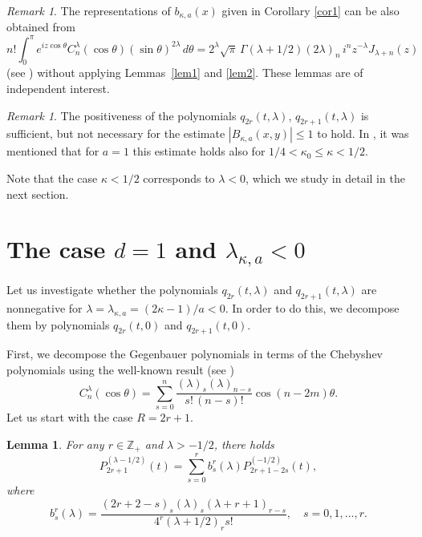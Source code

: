 \documentclass[12pt,twoside,reqno]{amsart}\usepackage[cp1251]{inputenc}
\theoremstyle{plain}
\newtheorem{lemma}[theorem]{Lemma}
\theoremstyle{remark}
\newtheorem{remark}[theorem]{Remark}
\begin{document}
\begin{remark}%
The  representations of $b_{\kappa,a}(x)$ given in Corollary \ref{cor1} can be also obtained from %
\[
n!\int_{0}^{\pi}e^{iz\cos\theta}C_{n}^{\lambda}(\cos\theta)(\sin\theta)^{2\lambda}\,d\theta=
2^{\lambda}\sqrt{\pi}\,\Gamma(\lambda+1/2)(2\lambda)_n\,i^nz^{-\lambda}J_{\lambda+n}(z)
\]
(see \cite[Chapt. X, 10.9(38)]{BE53a}) without applying Lemmas~\ref{lem1} and \ref{lem2}. These lemmas are of independent interest.
\end{remark}

\begin{remark}%
The positiveness of the polynomials $q_{2r}(t,\lambda)$, $q_{2r+1}(t,\lambda)$ is sufficient, but not necessary
for the estimate $|B_{\kappa,a}(x,y)|\le 1$ to hold.
In \cite{GIT16}, it was mentioned that for
$a=1$ this estimate holds also for  $1/4<\kappa_0\le \kappa<1/2$.
\end{remark}

Note that the case $\kappa<1/2$ corresponds to $\lambda<0$, which we study in detail in the next section.


\vspace{0.6mm}

\section{The case $d=1$ and $\lambda_{\kappa,a}<0$}\label{sec3}

Let us investigate whether  the polynomials  $q_{2r}(t,\lambda)$ and
$q_{2r+1}(t,\lambda)$ are nonnegative for  $\lambda=\lambda_{\kappa,a}=(2\kappa-1)/a<0$. In order to do this, we decompose
them by polynomials $q_{2r}(t,0)$ and $q_{2r+1}(t,0)$.

First, we decompose the Gegenbauer polynomials in terms of the Chebyshev polynomials using the well-known result  (see \cite[10.9(17)]{BE53a})
\begin{equation}\label{eq14}
C_{n}^{\lambda}(\cos\theta)=\sum_{s=0}^{n}\frac{(\lambda)_s(\lambda)_{n-s}}{s!\,(n-s)!}\cos{}(n-2m)\theta.
\end{equation}
Let us start with the case $R=2r+1$.
\begin{lemma}%
For any  $r\in\mathbb{Z}_+$ and $\lambda>-1/2$, there holds
\begin{equation}\label{eq15}
P_{2r+1}^{(\lambda-1/2)}(t)=\sum_{s=0}^{r}b_s^r(\lambda)P_{2r+1-2s}^{(-1/2)}(t),
\end{equation}
where
\[
b_s^r(\lambda)=\frac{(2r+2-s)_{s}(\lambda)_{s}(\lambda+r+1)_{r-s}}{4^r(\lambda+1/2)_{r}s!},\quad s=0,1,\dots,r.
\]
\end{lemma}
\end{document}
